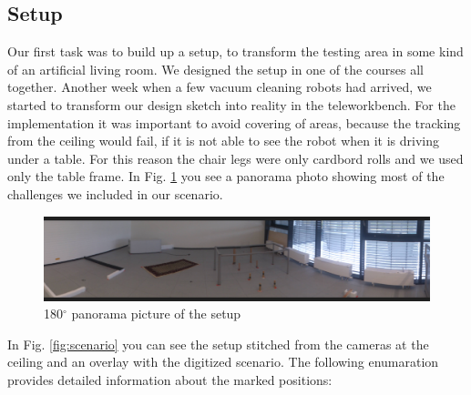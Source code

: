 \documentclass[twoside]{article}
\begin{document}
\subsection{Setup} %
Our first task was to build up a setup, to transform the testing area in some kind of an artificial living room. We designed the setup in one of the courses all together. Another week when a few vacuum cleaning robots had arrived, we started to transform our design sketch into reality in the teleworkbench.
For the implementation it was important to avoid covering of areas, because the tracking from the ceiling would fail, if it is not able to see the robot when it is driving under a table.
For this reason the chair legs were only cardbord rolls and we used only the table frame. In Fig. \ref{fig:panorama} you see a panorama photo showing most of the challenges we included in our scenario. 
\begin{figure}[H]
	\centering
	\includegraphics[scale=0.09]{pictures/Setup_panorama.JPG}
	\caption{180$^\circ$ panorama picture of the setup}
	\label{fig:panorama}
\end{figure}
\noindent
In Fig. \ref{fig:scenario} you can see the setup stitched from the cameras at the ceiling and an overlay with the digitized scenario. The following enumaration provides detailed information about the marked positions:
\end{document}
